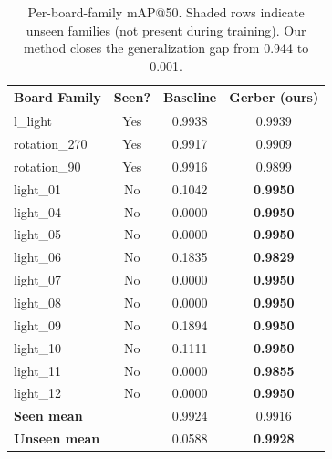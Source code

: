 \begin{table}[t]
\centering
\caption{Per-board-family mAP@50. Shaded rows indicate unseen families
         (not present during training). Our method closes the
         generalization gap from 0.944 to 0.001.}
\label{tab:perfamily}
\begin{tabular}{lccc}
\toprule
\textbf{Board Family} & \textbf{Seen?} & \textbf{Baseline} & \textbf{Gerber (ours)} \\
\midrule
l\_light       & Yes & 0.9938 & 0.9939 \\
rotation\_270  & Yes & 0.9917 & 0.9909 \\
rotation\_90   & Yes & 0.9916 & 0.9899 \\
\midrule
light\_01      & No  & 0.1042 & \textbf{0.9950} \\
light\_04      & No  & 0.0000 & \textbf{0.9950} \\
light\_05      & No  & 0.0000 & \textbf{0.9950} \\
light\_06      & No  & 0.1835 & \textbf{0.9829} \\
light\_07      & No  & 0.0000 & \textbf{0.9950} \\
light\_08      & No  & 0.0000 & \textbf{0.9950} \\
light\_09      & No  & 0.1894 & \textbf{0.9950} \\
light\_10      & No  & 0.1111 & \textbf{0.9950} \\
light\_11      & No  & 0.0000 & \textbf{0.9855} \\
light\_12      & No  & 0.0000 & \textbf{0.9950} \\
\midrule
\textbf{Seen mean}   & & 0.9924 & 0.9916 \\
\textbf{Unseen mean} & & 0.0588 & \textbf{0.9928} \\
\bottomrule
\end{tabular}
\end{table}
